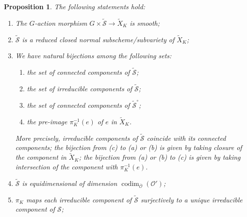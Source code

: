 \documentclass{amsart}
\newtheorem{proposition}[theorem]{Proposition}
\theoremstyle{definition}
\DeclareMathOperator{\codim}{codim}
\newcommand{\cS}{\mathcal{S}}
\newcommand{\0}{\mathcal{O}}
\begin{document}
\begin{proposition}\label{prop:slice}
	The following statements hold:
	\begin{enumerate}[ref=(\arabic*)]
		\item \label{item:slice_smooth} 
		The $G$-action morphism $G \times \widetilde{\cS} \to \widetilde{X}_K$ is smooth;

		\item \label{item:slice_reduced_normal}
		$\widetilde{\cS}$ is a reduced closed normal subscheme/subvariety of $\widetilde{X}_K$;
		
		\item \label{item:slice_bijections}
		We have natural bijections among the following sets:
		\begin{enumerate}
			\item the set of connected components of $\widetilde{\cS}$;
			\item the set of irreducible components of $\widetilde{\cS}$;
			\item the set of connected components of $\widetilde{\cS}^{\circ}$;
			\item the pre-image $\pi_K^{-1}(e)$ of $e$ in $\widetilde{X}_K$.
		\end{enumerate}
		More precisely, irreducible components of $\widetilde{\cS}$ coincide with its connected components; the bijection from (c) to (a) or (b) is given by taking closure of the component in $\widetilde{X}_K$; the bijection from (a) or (b) to (c) is given by taking intersection of the component with $\pi_K^{-1}(e)$.

		\item \label{item:slice_dim}
		$\widetilde{\cS}$ is equidimensional of dimension $\codim_{\overline{\0}}(\0')$;
		
		\item \label{item:slice_surjective}
		$\pi_K$ maps each irreducible component of $\widetilde{\cS}$ surjectively to a unique irreducible component of $\cS$;
	\end{enumerate}
\end{proposition}
\end{document}
